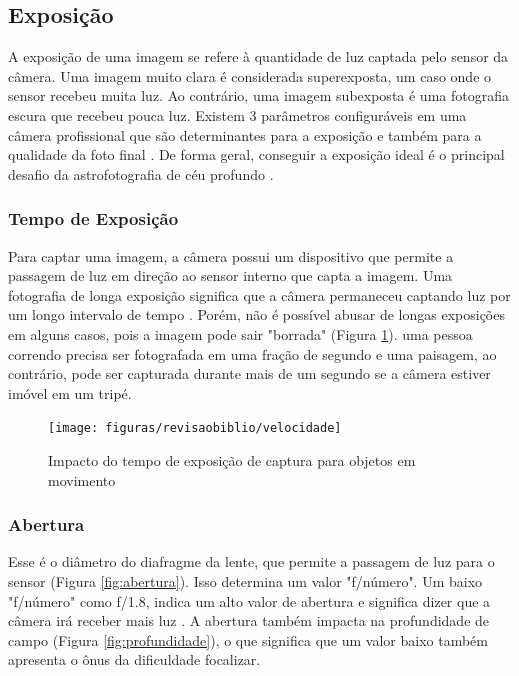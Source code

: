 \subsection{Exposição}

A exposição de uma imagem se refere à quantidade de luz captada pelo sensor da câmera. Uma imagem muito clara é considerada superexposta, um caso onde o sensor recebeu muita luz. Ao contrário, uma imagem subexposta é uma fotografia escura que recebeu pouca luz. Existem 3 parâmetros configuráveis em uma câmera profissional que são determinantes para a exposição e também para a qualidade da foto final \cite{site:eduardoemonica}. De forma geral, conseguir a exposição ideal é o principal desafio da astrofotografia de céu profundo \cite{livro:astropratica}.


\subsubsection{Tempo de Exposição}

Para captar uma imagem, a câmera possui um dispositivo que permite a passagem de luz em direção ao sensor interno que capta a imagem. Uma fotografia de longa exposição significa que a câmera permaneceu captando luz por um longo intervalo de tempo \cite{book:bbcsky}. Porém, não é possível abusar de longas exposições em alguns casos, pois a imagem pode sair "borrada" (Figura \ref{fig:velocidade}). uma pessoa correndo precisa ser fotografada em uma fração de segundo e uma paisagem, ao contrário, pode ser capturada durante mais de um segundo se a câmera estiver imóvel em um tripé.  

\begin{figure}[!htb]
	\centering
	\caption{Impacto do tempo de exposição de captura para objetos em movimento}
	\texttt{[image: figuras/revisaobiblio/velocidade]}
	\label{fig:velocidade}
\end{figure}

\subsubsection{Abertura}

Esse é o diâmetro do diafragme da lente, que permite a passagem de luz para o sensor (Figura \ref{fig:abertura}). Isso determina um valor "f/número". Um baixo "f/número" como f/1.8, indica um alto valor de abertura e significa dizer que a câmera irá receber mais luz \cite{book:bbcsky}. A abertura também impacta na profundidade de campo (Figura \ref{fig:profundidade}), o que significa que um valor baixo também apresenta o ônus da dificuldade focalizar.


